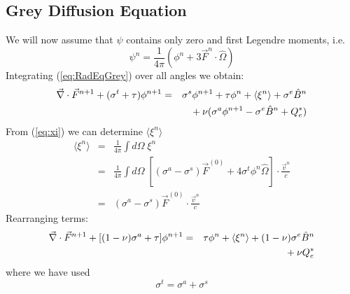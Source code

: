 \documentclass{article}
\newcommand{\Bn}{\ensuremath{\hat{B}^{n}}}
\begin{document}
\subsection{Grey Diffusion Equation}

We will now assume that $\psi$ contains only zero and first Legendre moments,
i.e.\ 
\begin{equation}
        \psi^{n} = \frac{1}{4\pi} \left(
                        \phi^{n} + 3 \vec{F}^{n} \cdot \hat{\Omega}
                   \right)
\end{equation}
Integrating (\ref{eq:RadEqGrey}) over all angles
we obtain:
\begin{eqnarray}
\del \cdot \vec{F}^{n+1} + (\sigma^{t} + \tau) \phi^{n+1}
        &=& \sigma^{s}\phi^{n+1} + \tau \phi^{n}
        + \langle \xi^{n} \rangle
        + \sigma^{e} \Bn 
        \nonumber \\
        & & \mbox{}
        + \nu (\sigma^{a}\phi^{n+1} - \sigma^{e}\Bn + Q_{e}^{*})
\end{eqnarray}
From (\ref{eq:xi}) we can determine $\langle \xi^{n} \rangle$
\begin{eqnarray}
        \langle \xi^{n} \rangle &=&
                \frac{1}{4\pi} \int d\Omega \; \xi^{n}
                \\
                &=& \frac{1}{4\pi} \int d\Omega \;
                    \left[ (\sigma^{a} - \sigma^{s}) \vec{F}^{(0)}
                        + 4 \sigma^{t} \phi^{n} \hat{\Omega} \right]
                                \cdot \frac{\vec{v}^{n}}{c}
                \\
                 &=& (\sigma^{a} - \sigma^{s}) \vec{F}^{(0)}
                        \cdot \frac{\vec{v}^{n}}{c}
\label{eq:l_xi_r}
\end{eqnarray}
Rearranging terms:
\begin{eqnarray}
\del \cdot \vec{F}^{n+1} + [(1 - \nu) \sigma^{a} + \tau ] \phi^{n+1}
        &=& \tau \phi^{n}
        + \langle \xi^{n} \rangle
        + (1 - \nu) \sigma^{e} \Bn  
        \nonumber \\
        & & \mbox{}
        + \nu Q_{e}^{*}
\label{eq:phiEq}
\end{eqnarray}
where we have used
\begin{equation}
        \sigma^{t} = \sigma^{a} + \sigma^{s}
\end{equation}
\end{document}
